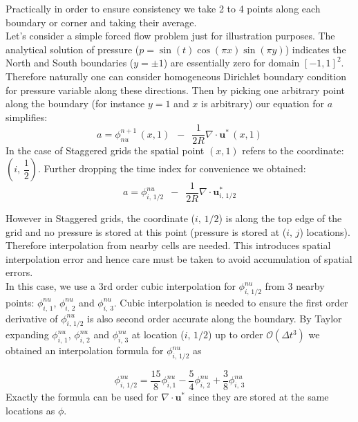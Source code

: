 Practically in order to ensure consistency we take 2 to 4 points along each boundary or corner and taking their average. \\

Let's consider a simple forced flow problem just for illustration purposes. The analytical solution of pressure ($p = \sin(t)\cos(\pi x)\sin(\pi y)$) indicates the North and South boundaries ($y=\pm 1$) are essentially zero for domain $[-1,1]^2$. Therefore naturally one can consider homogeneous Dirichlet boundary condition for pressure variable along these directions. Then by picking one arbitrary point along the boundary (for instance $y=1$ and $x$ is arbitrary) our equation for $a$ simplifies:
\begin{equation*}
a = \phi^{n+1}_{nu}\,(x,1) \,\,\,-\,\,\, \dfrac{1}{2R} \nabla \cdot \textbf{u}^*\,(x,1)
\end{equation*}
In the case of Staggered grids the spatial point $(x,1)$ refers to the coordinate: $(i,\,\dfrac{1}{2})$. Further dropping the time index for convenience we obtained:
\begin{equation*}
a = \phi^{nu}_{i,\,1/2} \,\,\,-\,\,\, \dfrac{1}{2R} \nabla \cdot \textbf{u}^*_{i,\,1/2}
\end{equation*}

However in Staggered grids, the coordinate ($i,\,1/2$) is along the top edge of the grid and no pressure is stored at this point (pressure is stored at ($i,\,j$) locations). Therefore interpolation from nearby cells are needed. This introduces spatial interpolation error and hence care must be taken to avoid accumulation of spatial errors.\\

In this case, we use a 3rd order cubic interpolation for $\phi^{nu}_{i,\,1/2}$ from 3 nearby points: $\phi^{nu}_{i,\,1}$, $\phi^{nu}_{i,\,2}$ and $\phi^{nu}_{i,\,3}$. Cubic interpolation is needed to ensure the first order derivative of $\phi^{nu}_{i,\,1/2}$ is also second order accurate along the boundary. By Taylor expanding $\phi^{nu}_{i,\,1}$, $\phi^{nu}_{i,\,2}$ and $\phi^{nu}_{i,\,3}$ at location ($i,\,1/2$) up to order $\mathcal{O}(\Delta t^3)$ we obtained an interpolation formula for $\phi^{nu}_{i,\,1/2}$ as

\begin{equation}
\phi^{nu}_{i,\,1/2} = \dfrac{15}{8}\phi^{nu}_{i,1} - \dfrac{5}{4}\phi^{nu}_{i,\,2}+\dfrac{3}{8}\phi^{nu}_{i,\,3}
\end{equation}
Exactly the formula can be used for $\nabla \cdot \textbf{u}^*$ since they are stored at the same locations as $\phi$.\\

